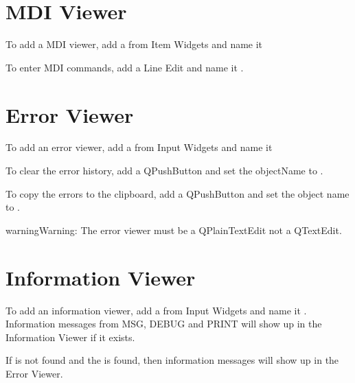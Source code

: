 \documentclass[letterpaper,10pt,english]{sphinxmanual}
\begin{document}
\section{MDI Viewer}
\label{\detokenize{misc:mdi-viewer}}
\sphinxAtStartPar
To add a MDI viewer, add a  from Item Widgets and name it


\sphinxAtStartPar
To enter MDI commands, add a Line Edit and name it .


\section{Error Viewer}
\label{\detokenize{misc:error-viewer}}
\sphinxAtStartPar
To add an error viewer, add a  from Input Widgets and name it


\sphinxAtStartPar
To clear the error history, add a QPushButton and set the objectName to
.

\sphinxAtStartPar
To copy the errors to the clipboard, add a QPushButton and set the object name
to .

\begin{sphinxadmonition}{warning}{Warning:}
\sphinxAtStartPar
The error viewer must be a QPlainTextEdit not a QTextEdit.
\end{sphinxadmonition}


\section{Information Viewer}
\label{\detokenize{misc:information-viewer}}
\sphinxAtStartPar
To add an information viewer, add a  from Input Widgets and name
it . Information messages from MSG, DEBUG and PRINT will show up in
the Information Viewer if it exists.

\sphinxAtStartPar
If  is not found and the  is found, then information
messages will show up in the Error Viewer.
\end{document}
